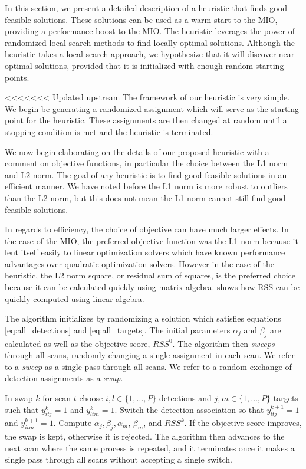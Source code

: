 In this section, we present a detailed description of a heuristic that finds good feasible solutions. These solutions can be used as a warm start to the MIO, providing a performance boost to the MIO. The heuristic leverages the power of randomized local search methods to find locally optimal solutions. Although the heuristic takes a local search approach, we hypothesize that it will discover near optimal solutions, provided that it is initialized with enough random starting points. 

<<<<<<< Updated upstream
The framework of our heuristic is very simple. We begin be generating a randomized assignment which will serve as the starting point for the heuristic. These assignments are then changed at random until a stopping condition is met and the heuristic is terminated. 

We now begin elaborating on the details of our proposed heuristic with a comment on objective functions, in particular the choice between the L1 norm and L2 norm. The goal of any heuristic is to find good feasible solutions in an efficient manner. We have noted before the L1 norm is more robust to outliers than the L2 norm, but this does not mean the L1 norm cannot still find good feasible solutions. 

In regards to efficiency, the choice of objective can have much larger effects. In the case of the MIO, the preferred objective function was the L1 norm because it lent itself easily to linear optimization solvers which have known performance advantages over quadratic optimization solvers. However in the case of the heuristic, the L2 norm square, or residual sum of squares, is the preferred choice because it can be calculated quickly using matrix algebra. \cite{RSS-Matrix} shows how RSS can be quickly computed using linear algebra.

The algorithm initializes by randomizing a solution which satisfies equations \eqref{eq:all_detections} and \eqref{eq:all_targets}. The initial parameters $\alpha_{j}$ and $\beta_{j}$ are calculated as well as the objective score, $RSS^{0}$. The algorithm then \textit{sweeps} through all scans, randomly changing a single assignment in each scan. We refer to a \textit{sweep} as a single pass through all scans. We refer to a random exchange of detection assignments as a \textit{swap}.

In swap $k$ for scan $t$ choose $i,l\in \{1,\ldots,P\}$ detections and $j,m\in\{1,\ldots,P\}$ targets such that $y^k_{itj}=1$ and $y^k_{ltm}=1$. Switch the detection association so that $y^{k+1}_{ltj}=1$ and $y^{k+1}_{itm}=1$. Compute $\alpha_{j}, \beta_{j}, \alpha_{m}$, $\beta_{m}$, and $RSS^{k}$. If the objective score improves, the swap is kept, otherwise it is rejected. The algorithm then advances to the next scan where the same process is repeated, and it terminates once it makes a single pass through all scans without accepting a single switch. 

